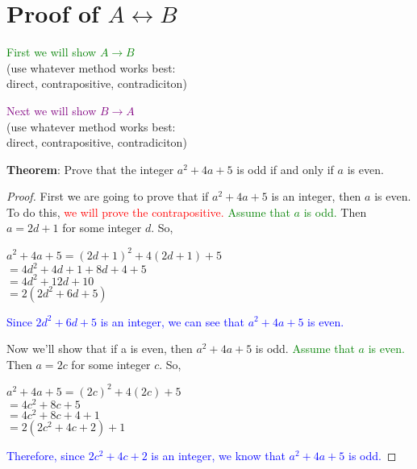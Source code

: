 \documentclass[11pt, oneside]{article}
\begin{document}
  \section{Proof of $A \leftrightarrow B$}
		  \begin{multicols}{2} 
		  \begin{minipage}{3in}
		  \begin{center}
		  \textcolor{green}{First we will show $A \rightarrow B$} \\
		  (use whatever method works best:\\
		  direct, contrapositive, contradiciton)\\[0.2in] \end{center}
 		 \end{minipage}
  
	       \begin{minipage}{2.5in} \begin{center}
	       \textcolor{purple}{Next we will show $B \rightarrow A$}\\
	      (use whatever method works best:\\
 	     direct, contrapositive, contradiciton)\\[0.2in]
 		\end{center}  \end{minipage} \end{multicols}
		
\noindent \textbf{Theorem}:   Prove that the integer $a^{2}+4a+5$ is odd if and only if $a$ is even.
\begin{proof}
First we are going to prove that if $a^{2}+4a+5$ is an integer, then $a$ is even. To do this, 
\textcolor{red}{we will prove the contrapositive.}
\textcolor{green}{Assume that $a$ is odd.} Then $a=2d+1$ for some integer $d$. So,
\begin{center}
$a^{2}+4a+5=(2d+1)^{2}+4(2d+1)+5$\\
$=4d^{2}+4d+1+8d+4+5$\\
$=4d^{2}+12d+10$\\
$=2(2d^{2}+6d+5)$\\
\end{center}
\textcolor{blue}{Since $2d^{2}+6d+5$ is an integer, we can see that $a^{2}+4a+5$ is even.}

Now we'll show that if a is even, then $a^{2}+4a+5$ is odd. 
\textcolor{green}{Assume that $a$ is even.} Then $a=2c$ for some integer $c$. So,
\begin{center}
$a^{2}+4a+5=(2c)^{2}+4(2c)+5$\\
$=4c^{2}+8c+5$\\
$=4c^{2}+8c+4+1$\\
$=2(2c^{2}+4c+2)+1$\\
\end{center}
\textcolor{blue}{Therefore, since $2c^{2}+4c+2$ is an integer, we know that $a^{2}+4a+5$ is odd.}
\end{proof}
 
\end{document}
